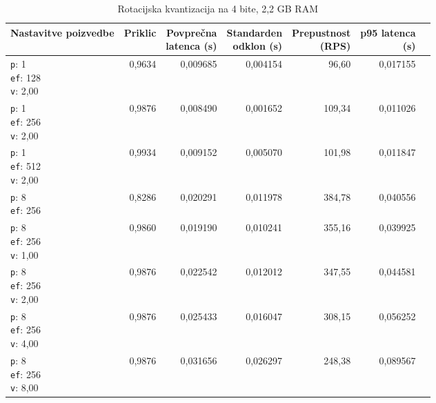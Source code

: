 \begin{table}[htbp]
  \centering
\small
  \caption{Rotacijska kvantizacija na 4 bite, 2,2 GB RAM}
  \label{tab:single-2cpu-2.2ram:tq4:qdrant-dipl-baseline-tenant-subgraph-tq4-ext-m16-ef-128-random-768-100-tenants-extended-upload-2026-08-18-11-57-03.json}
  \begin{tabularx}{\textwidth}{Xrrrrrr}
    \toprule
    Nastavitve poizvedbe & Priklic & \makecell{Povprečna\\latenca (s)} & \makecell{Standarden\\odklon (s)} & \makecell{Prepustnost\\(RPS)} & \makecell{p95 latenca\\(s)}  \\
    \midrule
    \makecell{\texttt{p}: 1\\\texttt{ef}: 128\\\texttt{v}: 2,00} & 0,9634 & 0,009685 & 0,004154 & 96,60 & 0,017155 \\
    \makecell{\texttt{p}: 1\\\texttt{ef}: 256\\\texttt{v}: 2,00} & 0,9876 & 0,008490 & 0,001652 & 109,34 & 0,011026 \\
    \makecell{\texttt{p}: 1\\\texttt{ef}: 512\\\texttt{v}: 2,00} & 0,9934 & 0,009152 & 0,005070 & 101,98 & 0,011847 \\
    \makecell{\texttt{p}: 8\\\texttt{ef}: 256} & 0,8286 & 0,020291 & 0,011978 & 384,78 & 0,040556 \\
    \makecell{\texttt{p}: 8\\\texttt{ef}: 256\\\texttt{v}: 1,00} & 0,9860 & 0,019190 & 0,010241 & 355,16 & 0,039925 \\
    \makecell{\texttt{p}: 8\\\texttt{ef}: 256\\\texttt{v}: 2,00} & 0,9876 & 0,022542 & 0,012012 & 347,55 & 0,044581 \\
    \makecell{\texttt{p}: 8\\\texttt{ef}: 256\\\texttt{v}: 4,00} & 0,9876 & 0,025433 & 0,016047 & 308,15 & 0,056252 \\
    \makecell{\texttt{p}: 8\\\texttt{ef}: 256\\\texttt{v}: 8,00} & 0,9876 & 0,031656 & 0,026297 & 248,38 & 0,089567 \\

\end{tabularx}
\end{table}
